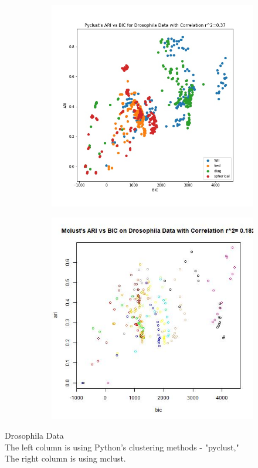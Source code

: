 \documentclass{article}
\begin{document}
\begin{figure}[h!]
\begin{subfigure}[b]{0.3\linewidth}
  \includegraphics[width=\linewidth]{python_drosophila_bicari.jpg}
\end{subfigure}
\begin{subfigure}[b]{0.3\linewidth}
  \includegraphics[width=\linewidth]{r_drosophila_bicari.jpg}
\end{subfigure} 
\end{figure}
\noindent Drosophila Data \\
The left column is using Python's clustering methods - "pyclust,"\\
The right column is using mclust. \\ \\
\end{document}
